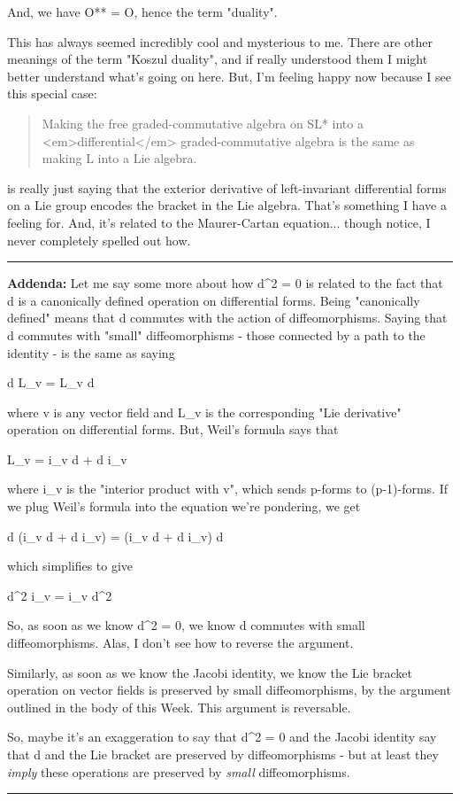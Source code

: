And, we have O** = O, hence the term "duality".

This has always seemed incredibly cool and mysterious to me.
There are other meanings of the term "Koszul duality", and if 
really understood them I might better understand what's going on
here.  But, I'm feeling happy now because I see this special case:

\begin{quote}
 Making the free graded-commutative algebra on SL* into a <em>differential</em>
 graded-commutative algebra is the same as making L into a Lie algebra.  
\end{quote}
    

is really just saying that the exterior derivative of left-invariant
differential forms on a Lie group encodes the bracket in the Lie algebra.
That's something I have a feeling for.  And, it's related to the 
Maurer-Cartan equation... though notice, I never completely spelled out
how.


\par\noindent\rule{\textwidth}{0.4pt}

\textbf{Addenda:} Let me say some more about how d^{2} = 0 is
related to the fact that d is a canonically defined operation on
differential forms.  Being "canonically defined" means that
d commutes with the action of diffeomorphisms.  Saying that d commutes
with "small" diffeomorphisms - those connected by a path to
the identity - is the same as saying

d L_{v} = L_{v} d

where v is any vector field and L_{v} is the corresponding
"Lie derivative" operation on differential forms.  But,
Weil's formula says that

L_{v} = i_{v} d + d i_{v}

where i_{v} is the "interior product with v", which
sends p-forms to (p-1)-forms.  If we plug Weil's formula into the
equation we're pondering, we get

d (i_{v} d + d i_{v}) = (i_{v} d + d i_{v}) d

which simplifies to give

d^{2} i_{v} = i_{v} d^{2}

So, as soon as we know d^{2} = 0, we know d commutes with small 
diffeomorphisms.   Alas, I don't see how to reverse the argument.

Similarly, as soon as we know the Jacobi identity, we know the
Lie bracket operation on vector fields is preserved by small
diffeomorphisms, by the argument outlined in the body of this Week.
This argument is reversable.

So, maybe it's an exaggeration to say that d^{2} = 0 and the Jacobi
identity say that d and the Lie bracket are preserved by 
diffeomorphisms - but at least they \emph{imply} these operations are 
preserved by \emph{small} diffeomorphisms.

\par\noindent\rule{\textwidth}{0.4pt}


